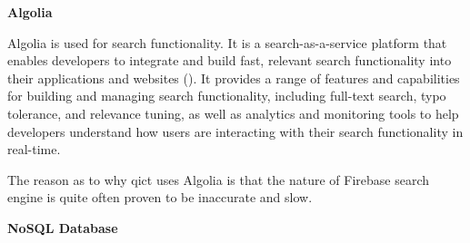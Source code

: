 \begin{multicols}{2}
      \textbf{Algolia}

      Algolia is used for search functionality. It is a search-as-a-service platform that enables developers to
      integrate and build fast, relevant search functionality into their applications and websites (\cite{algolia}).
      It provides a range of features and capabilities for building and managing search functionality, including
      full-text search, typo tolerance, and relevance tuning, as well as analytics and monitoring tools to help
      developers understand how users are interacting with their search functionality in real-time.

      The reason as to why \acrshort{qict} uses Algolia is that the nature of Firebase search engine is quite often
      proven to be inaccurate and slow.

      \textbf{NoSQL Database}


\end{multicols}
